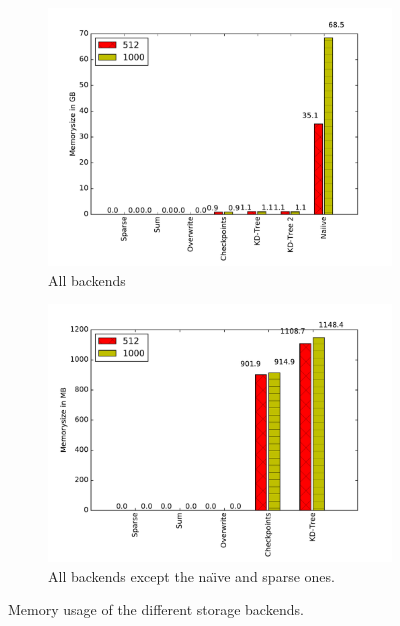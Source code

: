 \begin{figure}
\begin{subfigure}[t]{0.5\textwidth}
\centering
\includegraphics[width=\linewidth]{images/mem_size}
\caption{All backends}
\label{fig:memory_usage}
\end{subfigure}%
%
\begin{subfigure}[t]{0.5\textwidth}
\centering
\includegraphics[width=\linewidth]{images/mem_size2}
\caption{All backends except the na\"{\i}ve and sparse ones.}
\label{fig:memory_usage2}
\end{subfigure}

\caption{Memory usage of the different storage backends.}
\end{figure}

